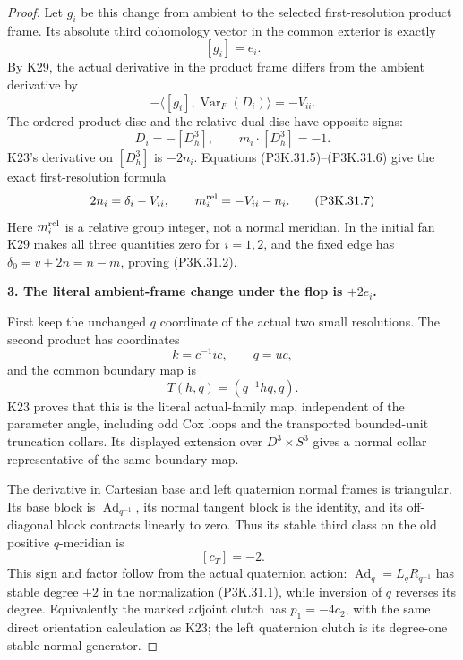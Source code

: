 \begin{proof}
Let \(g_i\) be this change from ambient to the selected
first-resolution product frame. Its absolute third
cohomology vector in the common exterior is exactly
\[
                              [g_i]=e_i.
                                                        \tag{P3K.31.5}
\]
By K29, the actual derivative in the product frame
differs from the ambient derivative by
\[
           -\langle[g_i],\operatorname{Var}_F(D_i)\rangle=-V_{ii}.
\]
The ordered product disc and the relative dual
disc have opposite signs:
\[
              D_i=-[D^3_h],\qquad
              m_i\cdot[D^3_h]=-1.
                                                        \tag{P3K.31.6}
\]
K23's derivative on \([D^3_h]\) is \(-2n_i\). Equations
(P3K.31.5)--(P3K.31.6) give the exact first-resolution formula
\[
                    2n_i=\delta_i-V_{ii},\qquad
                    m_i^{\rm rel}=-V_{ii}-n_i.
                                                        \tag{P3K.31.7}
\]
Here \(m_i^{\rm rel}\) is a relative group integer, not a
normal meridian. In the initial fan K29 makes all three
quantities zero for \(i=1,2\), and the fixed edge has
\(\delta_0=v+2n=n-m\), proving (P3K.31.2).

\par\medskip\noindent\textbf{3. The literal ambient-frame change under the flop is \(+2e_i\).}\enspace

First keep the unchanged \(q\) coordinate of the actual
two small resolutions. The second product has coordinates
\[
             k=c^{-1}ic,\qquad q=uc,
\]
and the common boundary map is
\[
                 T(h,q)=(q^{-1}h q,q).
                                                        \tag{P3K.31.8}
\]
K23 proves that this is the literal actual-family map,
independent of the parameter angle, including odd Cox
loops and the transported bounded-unit truncation collars.
Its displayed extension over \(D^3\times S^3\) gives a
normal collar representative of the same boundary map.

The derivative in Cartesian base and left quaternion
normal frames is triangular. Its base block is
\(\operatorname{Ad}_{q^{-1}}\), its normal tangent block
is the identity, and its off-diagonal block contracts
linearly to zero. Thus its stable third class on the
old positive \(q\)-meridian is
\[
                         [c_T]=-2.
                                                        \tag{P3K.31.9}
\]
This sign and factor follow from the actual quaternion
action: \(\operatorname{Ad}_q=L_qR_{q^{-1}}\) has stable
degree \(+2\) in the normalization (P3K.31.1), while inversion
of \(q\) reverses its degree. Equivalently the marked
adjoint clutch has \(p_1=-4c_2\), with the same direct
orientation calculation as K23; the left quaternion
clutch is its degree-one stable normal generator.


\end{proof}
